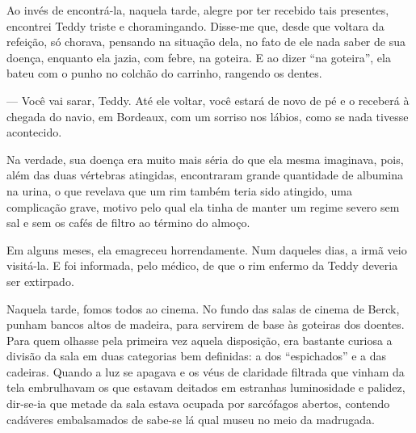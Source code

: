 
Ao invés de encontrá-la, naquela tarde, alegre por ter recebido tais
presentes, encontrei Teddy triste e choramingando. Disse-me que, desde
que voltara da refeição, só chorava, pensando na situação dela, no fato
de ele nada saber de sua doença, enquanto ela jazia, com febre, na
goteira. E ao dizer ``na goteira'', ela bateu com o punho no colchão do
carrinho, rangendo os dentes.

--- Você vai sarar, Teddy. Até ele voltar, você estará de novo de pé e o
receberá à chegada do navio, em Bordeaux, com um sorriso nos lábios,
como se nada tivesse acontecido.

Na verdade, sua doença era muito mais séria do que ela mesma imaginava,
pois, além das duas vértebras atingidas, encontraram grande quantidade
de albumina na urina, o que revelava que um rim também teria sido
atingido, uma complicação grave, motivo pelo qual ela tinha de manter um
regime severo sem sal e sem os cafés de filtro ao término do almoço.

Em alguns meses, ela emagreceu horrendamente. Num daqueles dias, a irmã
veio visitá-la. E foi informada, pelo médico, de que o rim enfermo da
Teddy deveria ser extirpado.

Naquela tarde, fomos todos ao cinema. No fundo das salas de cinema de
Berck, punham bancos altos de madeira, para servirem de base às goteiras
dos doentes. Para quem olhasse pela primeira vez aquela disposição, era
bastante curiosa a divisão da sala em duas categorias bem definidas: a
dos ``espichados'' e a das cadeiras. Quando a luz se apagava e os véus
de claridade filtrada que vinham da tela embrulhavam os que estavam
deitados em estranhas luminosidade e palidez, dir-se-ia que metade da
sala estava ocupada por sarcófagos abertos, contendo cadáveres
embalsamados de sabe-se lá qual museu no meio da madrugada.


